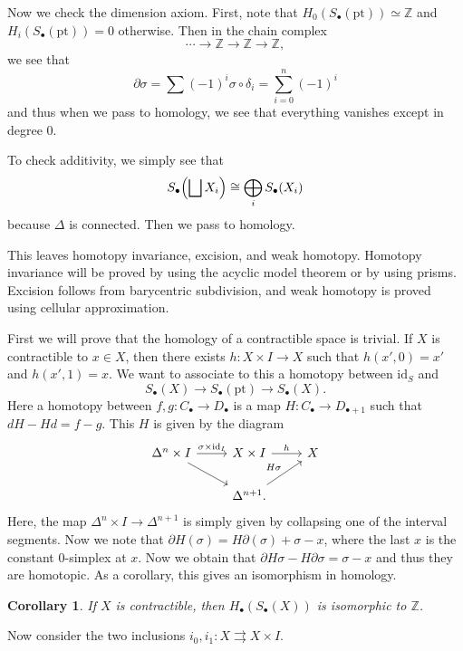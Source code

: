 \documentclass[leqno, openany]{memoir}
\newtheorem{cor}[thm]{Corollary}
\theoremstyle{definition}
\theoremstyle{remark}
\theoremstyle{plain}
\theoremstyle{definition}
\theoremstyle{remark}
\newcommand{\Z}{\mathbb{Z}}
\newcommand{\mr}[1]{\mathrm{#1}}
\begin{document}
Now we check the dimension axiom. First, note that $H_0(S_{\bullet}(\mr{pt})) \simeq \Z$ and $H_i(S_{\bullet}(\mr{pt})) = 0$ otherwise. Then in the chain complex 
\[ \cdots \to \Z \to \Z \to \Z, \]
we see that 
\[ \partial \sigma = \sum (-1)^i \sigma \circ \delta_i = \sum_{i=0}^n (-1)^i \]
and thus when we pass to homology, we see that everything vanishes except in degree $0$.

To check additivity, we simply see that 
\[ S_{\bullet}\qty(\bigsqcup X_i) \cong \bigoplus_i S_{\bullet} (X_i) \]
because $\Delta$ is connected. Then we pass to homology. 

This leaves homotopy invariance, excision, and weak homotopy. Homotopy invariance will be proved by using the acyclic model theorem or by using prisms. Excision follows from barycentric subdivision, and weak homotopy is proved using cellular approximation.

First we will prove that the homology of a contractible space is trivial. If $X$ is contractible to $x \in X$, then there exists $h \colon X \times I \to X$ such that $h(x', 0) = x'$ and $h(x',1) = x$. We want to associate to this a homotopy between $\mr{id}_S$ and 
\[ S_{\bullet}(X) \to S_{\bullet}(\mr{pt}) \to S_{\bullet}(X). \]
Here a homotopy between $f,g \colon C_{\bullet} \to D_{\bullet}$ is a map $H \colon C_{\bullet} \to D_{\bullet + 1}$ such that $dH - Hd = f-g$.
This $H$ is given by the diagram
\begin{equation*}
\begin{tikzcd}
    \Delta^n \times I \arrow{r}{\sigma \times \mr{id}_I} \arrow{dr} & X \times I \arrow{r}{h} & X \\
                                                                    & \Delta^{n+1} \arrow{ur}{H\sigma}.
\end{tikzcd}
\end{equation*}
Here, the map $\Delta^n \times I \to \Delta^{n+1}$ is simply given by collapsing one of the interval segments. Now we note that $\partial H(\sigma) = H \partial(\sigma) + \sigma - x$, where the last $x$ is the constant $0$-simplex at $x$. Now we obtain that $\partial H \sigma - H \partial \sigma = \sigma - x$ and thus they are homotopic. As a corollary, this gives an isomorphism in homology.

\begin{cor}
    If $X$ is contractible, then $H_{\bullet}(S_{\bullet}(X))$ is isomorphic to $\Z$.
\end{cor}

Now consider the two inclusions $i_0, i_1 \colon X \rightrightarrows X \times I$.
\end{document}

